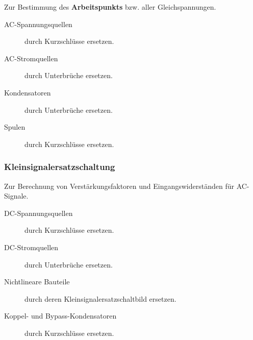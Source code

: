 Zur Bestimmung des \textbf{Arbeitspunkts} bzw. aller Gleichspannungen.
\begin{description}
    \item[AC-Spannungsquellen] durch Kurzschlüsse ersetzen.
    \item[AC-Stromquellen] durch Unterbrüche ersetzen. 
    \item[Kondensatoren] durch Unterbrüche ersetzen.
    \item[Spulen] durch Kurzschlüsse ersetzen.  
\end{description}

\subsubsection{Kleinsignalersatzschaltung}
Zur Berechnung von Verstärkungsfaktoren und Eingangswiderständen für AC-Signale.

\begin{description}
    \item[DC-Spannungsquellen] durch Kurzschlüsse ersetzen.
    \item[DC-Stromquellen] durch Unterbrüche ersetzen. 
    \item[Nichtlineare Bauteile] durch deren Kleinsignalersatzschaltbild ersetzen.
    \item[Koppel- und Bypass-Kondensatoren] durch Kurzschlüsse ersetzen.  
\end{description}